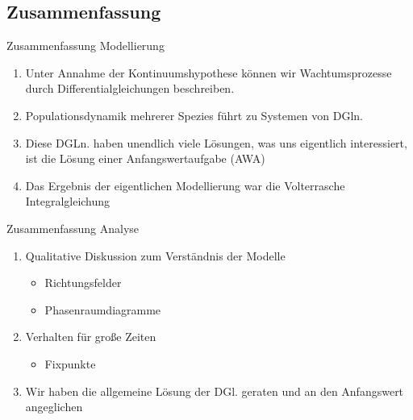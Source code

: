 \subsection{Zusammenfassung}
\frame{\subtoc}

\begin{frame}{Zusammenfassung Modellierung}
  \begin{enumerate}
  \item Unter Annahme der Kontinuumshypothese können wir
    Wachtumsprozesse durch Differentialgleichungen
    beschreiben.
  \item Populationsdynamik mehrerer Spezies führt zu Systemen von DGln.
  \item Diese DGLn. haben unendlich viele Lösungen, was uns eigentlich interessiert, ist die Lösung einer Anfangswertaufgabe (AWA)
  \item Das Ergebnis der eigentlichen Modellierung war die
    Volterrasche Integralgleichung
  \end{enumerate}
\end{frame}

\begin{frame}{Zusammenfassung Analyse}
  \begin{enumerate}
  \item Qualitative Diskussion zum Verständnis der Modelle
    \begin{itemize}
    \item Richtungsfelder
    \item Phasenraumdiagramme
    \end{itemize}
  \item Verhalten für große Zeiten
    \begin{itemize}
    \item Fixpunkte
    \end{itemize}
  \item Wir haben die allgemeine Lösung der DGl. geraten und an den
    Anfangswert angeglichen
  \end{enumerate}
\end{frame}

